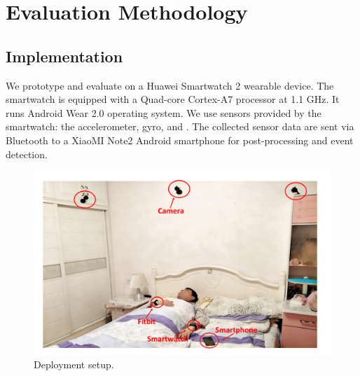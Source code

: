 \section{Evaluation Methodology}
\subsection{Implementation}
We prototype and evaluate \systemname on a Huawei Smartwatch 2 wearable device. The smartwatch is equipped with a Quad-core Cortex-A7
processor at 1.1 GHz.  It runs Android Wear 2.0 operating system. We use  sensors provided by the smartwatch: the
accelerometer, gyro, and . The collected sensor data are sent via Bluetooth to a XiaoMI Note2 Android smartphone for
post-processing and event detection. 

\begin{figure}[!thbp]
	\centering
	\includegraphics[width=0.52\linewidth]{Figures/setup.pdf}
	\caption{Deployment setup.}\label{fig:setup}
\end{figure}

